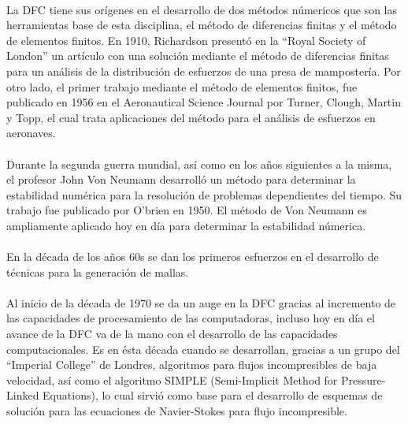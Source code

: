 \documentclass[letterpaper, openright, 12pt]{book}
\begin{document}
    \paragraph*{}
    La DFC tiene sus orígenes en el desarrollo de dos métodos
    númericos que son las herramientas base de esta disciplina,
    el método de diferencias finitas y el método de elementos
    finitos. En 1910, Richardson presentó en la ``Royal Society of
    London'' un artículo con una solución mediante el método de
    diferencias finitas para un análisis de la distribución de
    esfuerzos de una presa de mampostería. Por otro lado, el primer
    trabajo mediante el método de elementos finitos, fue publicado
    en 1956 en el Aeronautical Science Journal por Turner, Clough,
    Martin y Topp, el cual trata aplicaciones del método para el
    análisis de esfuerzos en aeronaves.\cite{tj-chung}

    \paragraph*{}
    Durante la segunda guerra mundial, así como en los años siguientes
    a la misma, el profesor John Von Neumann desarrolló un método
    para determinar la estabilidad numérica para la resolución de
    problemas dependientes del tiempo. Su trabajo fue publicado por
    O'brien en 1950. El método de Von Neumann es ampliamente
    aplicado hoy en día para determinar la estabilidad
    númerica.\cite{pletcher-CFD-HeatTransfer}

    \paragraph*{}
    En la década de los años 60s se dan los primeros esfuerzos en el
    desarrollo de técnicas para la generación de mallas.\cite{liseikin1999grid}

    \paragraph*{}
    Al inicio de la década de 1970 se da un auge en la DFC gracias
    al incremento de las capacidades de procesamiento de las
    computadoras, incluso hoy en día el avance de la DFC va de la
    mano con el desarrollo de las capacidades computacionales.\cite{blazek}
    Es en ésta década cuando se desarrollan, gracias a un grupo del
    ``Imperial College'' de Londres, algoritmos para flujos
    incompresibles de baja velocidad, así como el algoritmo SIMPLE
    (Semi-Implicit Method for Pressure-Linked Equations), lo cual
    sirvió como base para el desarrollo de esquemas de solución para
    las ecuaciones de Navier-Stokes para flujo
    incompresible.\cite{pletcher-CFD-HeatTransfer}
\end{document}
